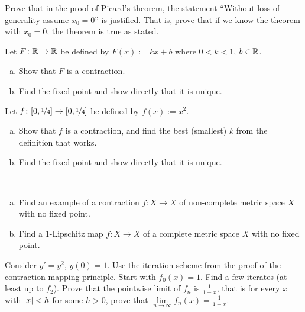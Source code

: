 \begin{exercise}
Prove that in the proof of Picard's theorem,
the statement ``Without loss of generality assume $x_0 = 0$'' is
justified.  That is, prove that if we know the theorem with $x_0 = 0$, the
theorem is true as stated.
\end{exercise}


\begin{exercise}
Let $F \colon {\mathbb{R}} \to {\mathbb{R}}$ be defined by
$F(x) := kx + b$ where $0 < k < 1$, $b \in {\mathbb{R}}$.
\begin{enumerate}[a)]
\item
Show that $F$ is a contraction.
\item
Find the fixed point and show directly that it is unique.
\end{enumerate}
\end{exercise}

\begin{exercise}
Let $f \colon [0,\nicefrac{1}{4}] \to [0,\nicefrac{1}{4}]$ be defined by
$f(x) := x^2$.
\begin{enumerate}[a)]
\item
Show that $f$
is a contraction, and find the best (smallest) $k$ from the definition that works.
\item
Find the fixed point and show directly that it is unique.
\end{enumerate}
\end{exercise}

\begin{samepage}
\begin{exercise} \label{exercise:nofixedpoint}
{\ }
\begin{enumerate}[a)]
\item
Find an example of a contraction $f \colon X \to X$
of non-complete metric space $X$ with no
fixed point.
\item
Find a 1-Lipschitz map $f \colon X \to X$ of a complete metric space $X$ with no fixed point.
\end{enumerate}
\end{exercise}
\end{samepage}

\begin{exercise}
Consider $y' =y^2$, $y(0)=1$.  Use the iteration scheme
from the proof of the contraction mapping principle.
Start with $f_0(x) = 1$.  Find a 
few iterates (at least up to $f_2$).  Prove that
the pointwise limit of $f_n$ is $\frac{1}{1-x}$, that is for every $x$
with $\left\lvert {x} \right\rvert < h$ for some $h > 0$,
prove that $\lim\limits_{n\to\infty}f_n(x) = \frac{1}{1-x}$.
\end{exercise}

